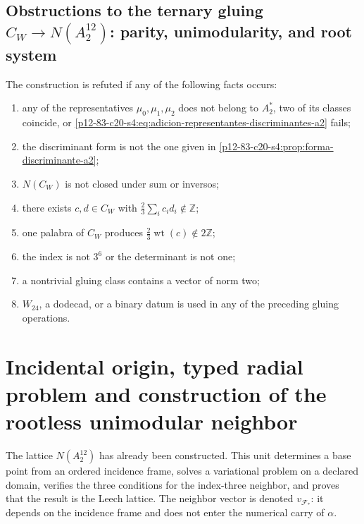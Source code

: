 \subsection{Obstructions to the ternary gluing \(C_W\to N(A_2^{12})\): parity, unimodularity, and root system}

\begin{criterion}
The construction is refuted if any of the following facts occurs:
\begin{enumerate}
 \item any of the representatives \(\mu_0,\mu_1,\mu_2\) does not belong to
       \(A_2^*\), two of its classes coincide, or
       \eqref{p12-83-c20-s4:eq:adicion-representantes-discriminantes-a2} fails;
 \item the discriminant form is not the one given in
       \cref{p12-83-c20-s4:prop:forma-discriminante-a2};
 \item \(N(C_W)\) is not closed under sum or inversos;
 \item there exists \(c,d\in C_W\) with
       \(\frac23\sum_i c_id_i\notin\mathbb Z\);
 \item one palabra of \(C_W\) produces
       \(\frac23\operatorname{wt}(c)\notin2\mathbb Z\);
 \item the index is not \(3^6\) or the determinant is not one;
 \item a nontrivial gluing class contains a vector of norm two;
 \item \(W_{24}\), a dodecad, or a binary datum is used in any of
the preceding gluing operations.
\end{enumerate}
\end{criterion}



\section{Incidental origin, typed radial problem and construction of the rootless unimodular neighbor}
\label{p12-83-c20-s5:chap:origen-incidencial-vecino-leech}

The lattice \(N(A_2^{12})\) has already been constructed. This unit determines a
base point from an ordered incidence frame, solves a
variational problem on a declared domain, verifies the three conditions
for the index-three neighbor, and proves that the result is the Leech
lattice. The neighbor vector is denoted \(v_{\mathcal F_*}\): it depends on the
incidence frame and does not enter the numerical carry of \(\alpha\).

